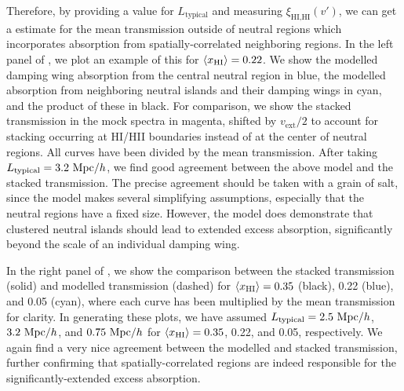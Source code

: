 Therefore, by providing a value for $L_{\text{typical}}$ and measuring $\xi_{\text{HI,HI}}(v')$, we can get a estimate for the mean transmission outside of neutral regions which incorporates absorption from spatially-correlated neighboring regions. In the left panel of , we plot an example of this for $\langle x_{\text{HI}}\rangle = 0.22$. We show the modelled damping wing absorption from the central neutral region in blue, the modelled absorption from neighboring neutral islands and their damping wings in cyan, and the product of these in black. For comparison, we show the stacked transmission in the mock spectra in magenta, shifted by $v_{\text{ext}}/2$ to account for stacking occurring at HI/HII boundaries instead of at the center of neutral regions. All curves have been divided by the mean transmission. 
After taking $L_{\text{typical}} = 3.2 \ \text{Mpc/$h$}$, we find good agreement between the above model and the stacked transmission. The precise agreement should be taken with a grain of salt, since the model
makes several simplifying assumptions, especially that the neutral regions have a fixed size. However, the model does demonstrate that clustered neutral islands should lead to extended excess
absorption, significantly beyond the scale of an individual damping wing.

In the right panel of , we show the comparison between the stacked transmission (solid) and modelled transmission (dashed) for $\langle x_{\text{HI}}\rangle = 0.35$ (black), 0.22 (blue), and 0.05 (cyan), where each curve has been multiplied by the mean transmission for clarity. In generating these plots, we have assumed $L_{\text{typical}} = 2.5 \ \text{Mpc/$h$}$, $3.2 \ \text{Mpc/$h$}$, and $0.75 \ \text{Mpc/$h$}$ for $\langle x_{\text{HI}}\rangle = 0.35$, 0.22, and 0.05, respectively. We again find a very nice agreement between the modelled and stacked transmission, further confirming that spatially-correlated regions are indeed responsible for the significantly-extended excess absorption.

